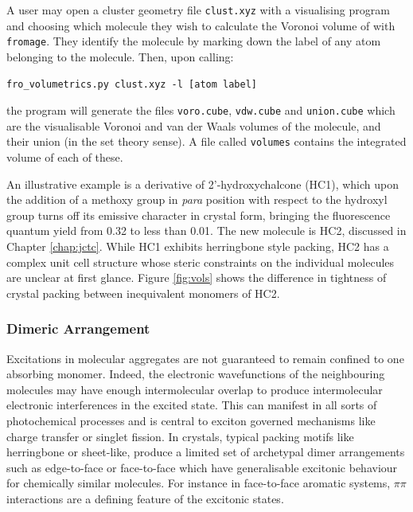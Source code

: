 A user may open a cluster geometry file \texttt{clust.xyz} with a visualising program and choosing which molecule they wish to calculate the Voronoi volume of with \texttt{fromage}. They identify the molecule by marking down the label of any atom belonging to the molecule. Then, upon calling:
\begin{verbatim}
fro_volumetrics.py clust.xyz -l [atom label]
\end{verbatim}
the program will generate the files \texttt{voro.cube}, \texttt{vdw.cube} and \texttt{union.cube} which are the visualisable Voronoi and van der Waals volumes of the molecule, and their union (in the set theory sense). A file called \texttt{volumes} contains the integrated volume of each of these.

An illustrative example is a derivative of 2'-hydroxychalcone (HC1), which upon the addition of a methoxy group in \textit{para} position with respect to the hydroxyl group turns off its emissive character in crystal form, bringing the fluorescence quantum yield from 0.32 to less than 0.01.\cite{Zhang2015,Zahid2017} The new molecule is HC2, discussed in Chapter \ref{chap:jctc}. While HC1 exhibits herringbone style packing, HC2 has a complex unit cell structure whose steric constraints on the individual molecules are unclear at first glance. Figure \ref{fig:vols} shows the difference in tightness of crystal packing between inequivalent monomers of HC2.

\subsubsection{Dimeric Arrangement}
\label{sec:dimer_axes}
Excitations in molecular aggregates are not guaranteed to remain confined to one absorbing monomer. Indeed, the electronic wavefunctions of the neighbouring molecules may have enough intermolecular overlap to produce intermolecular electronic interferences in the excited state. This can manifest in all sorts of photochemical processes and is central to exciton governed mechanisms like charge transfer or singlet fission. In crystals, typical packing motifs like herringbone or sheet-like, produce a limited set of archetypal dimer arrangements such as edge-to-face or face-to-face which have generalisable excitonic behaviour for chemically similar molecules.\cite{Kasha1965,Dommett2019} For instance in face-to-face aromatic systems, $\pi\pi$ interactions are a defining feature of the excitonic states.

